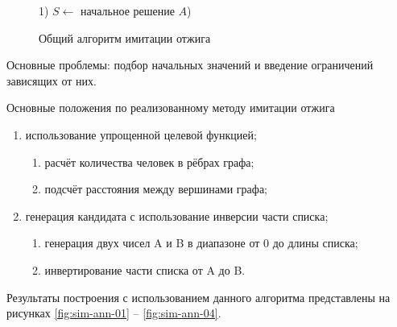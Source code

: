 \begin{figure}[ht!]
    \begin{algorithm}[H]
        1) \( S \leftarrow \) начальное решение \( A \)) 
    \end{algorithm}
    \vspace*{-1.5em}
    \caption{Общий алгоритм имитации отжига}
    \label{alg:simulated-anealing}
\end{figure}

Основные проблемы: подбор начальных значений и введение ограничений зависящих от них.

Основные положения по реализованному методу имитации отжига
\begin{enumerate}
    \item использование упрощенной целевой функцией;
    \begin{enumerate}
        \item расчёт количества человек в рёбрах графа;
        \item подсчёт расстояния между вершинами графа;
    \end{enumerate}
    \item генерация кандидата с использование инверсии части списка;
    \begin{enumerate}
        \item генерация двух чисел A и B в диапазоне от 0 до длины списка;
        \item инвертирование части списка от A до B.
    \end{enumerate}
\end{enumerate}

Результаты построения с использованием данного алгоритма представлены на рисунках 
\ref{fig:sim-ann-01} -- \ref{fig:sim-ann-04}.

\clearpage

